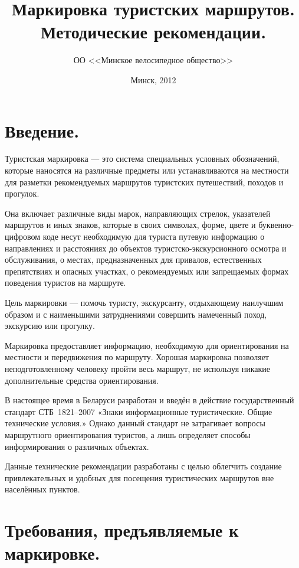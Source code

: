 \documentclass[a4paper,12pt,titlepage]{extarticle}
\author{ОО <<Минское велосипедное общество>>}
\date{Минск, 2012}
\title{Маркировка туристских маршрутов. Методические рекомендации.}
\begin{document}
\maketitle

\section{Введение.}

Туристская маркировка --- это система специальных условных обозначений, которые наносятся на различные предметы или устанавливаются на местности для разметки рекомендуемых маршрутов туристских путешествий, походов и прогулок.

Она включает различные виды марок, направляющих стрелок, указателей маршрутов и иных знаков, которые в своих символах,
форме, цвете и буквенно-цифровом коде несут необходимую для туриста путевую информацию о направлениях и расстояниях до
объектов туристско-экскурсионного осмотра и обслуживания, о местах, предназначенных для привалов, естественных
препятствиях и опасных участках, о рекомендуемых или запрещаемых формах поведения туристов на маршруте.\cite{metodussr}

Цель маркировки --- помочь туристу, экскурсанту, отдыхающему наилучшим образом и с наименьшими затруднениями совершить
намеченный поход, экскурсию или прогулку.

Маркировка предоставляет информацию, необходимую для ориентирования на местности и передвижения по маршруту. Хорошая
маркировка позволяет неподготовленному человеку пройти весь маршрут, не используя никакие дополнительные средства
ориентирования.

В настоящее время в Беларуси разработан и введён в действие государственный стандарт СТБ~1821--2007 «Знаки
информационные туристические. Общие технические условия.» Однако данный стандарт не затрагивает вопросы маршрутного
ориентирования туристов, а лишь определяет способы информирования о различных объектах.

Данные технические рекомендации разработаны с целью облегчить создание привлекательных и удобных для посещения
туристических маршрутов вне населённых пунктов.

\section{Требования, предъявляемые к маркировке.}
\end{document}
